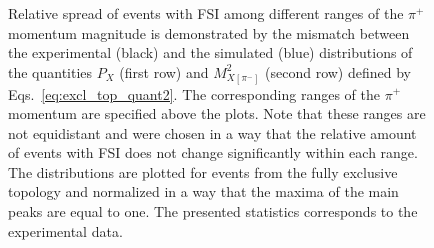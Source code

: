 \begin{figure}[!ht]
\begin{center}
\end{center}
\caption{\small Relative spread of events with FSI among different ranges of the $\pi^{+}$ momentum magnitude is demonstrated by the mismatch between the experimental (black) and the simulated (blue) distributions of the quantities $P_{X}$ (first row) and $M^{2}_{X[\pi^{-}]}$ (second row) defined by Eqs.~\eqref{eq:excl_top_quant2}. The corresponding ranges of the $\pi^{+}$ momentum are specified above the plots. Note that these ranges are not equidistant and were chosen in a way that the relative amount of events with FSI does not change significantly within each range. The distributions are plotted for events from the fully exclusive topology and normalized in a way that the maxima of the main peaks are equal to one. The presented statistics corresponds to the experimental data.}
\label{fig:fsi_mom_dep_pip}
\end{figure}
